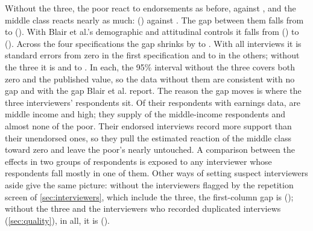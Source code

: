 \documentclass[11pt,letterpaper]{article}
\begin{document}
Without the three, the poor react to endorsements as before, \BlairLowWithout{} against \BlairLowFull{}, and the middle class reacts nearly as much: \BlairMiddleWithout{} (\BlairMiddleWithoutSE{}) against \BlairMiddleFull{}. The gap between them falls from \BlairGapFull{} to \BlairGapWithout{} (\BlairGapWithoutSE{}). With Blair et al.'s demographic and attitudinal controls it falls from \BlairGapControlsFull{} (\BlairGapControlsFullSE{}) to \BlairGapControlsWithout{} (\BlairGapControlsWithoutSE{}). Across the four specifications the gap shrinks by \BlairGapCutMin{} to \BlairGapCutMax{}. With all interviews it is \BlairGapTFirstFull{} standard errors from zero in the first specification and \BlairGapTControlsFullMin{} to \BlairGapTControlsFullMax{} in the others; without the three it is \BlairGapTFirstWithout{} and \BlairGapTControlsWithoutMin{} to \BlairGapTControlsWithoutMax{}. In each, the 95\% interval without the three covers both zero and the published value, so the data without them are consistent with no gap and with the gap Blair et al. report. The reason the gap moves is where the three interviewers' respondents sit. Of their \BlairThreeIncomeRespondents{} respondents with earnings data, \BlairThreeMiddle{} are middle income and \BlairThreeHigh{} high; they supply \BlairThreeShareOfMiddle{} of the middle-income respondents and almost none of the poor. Their endorsed interviews record more support than their unendorsed ones, so they pull the estimated reaction of the middle class toward zero and leave the poor's nearly untouched. A comparison between the effects in two groups of respondents is exposed to any interviewer whose respondents fall mostly in one of them. Other ways of setting suspect interviewers aside give the same picture: without the \BlairFlaggedInterviewers{} interviewers flagged by the repetition screen of \cref{sec:interviewers}, which include the three, the first-column gap is \BlairGapUnflagged{} (\BlairGapUnflaggedSE{}); without the three and the interviewers who recorded duplicated interviews (\cref{sec:quality}), \BlairDuplicatedInterviewers{} in all, it is \BlairGapUnduplicated{} (\BlairGapUnduplicatedSE{}).
\end{document}

